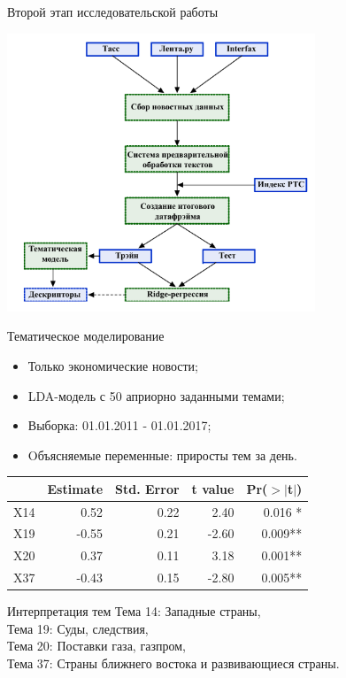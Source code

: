 \documentclass[c, dvipsnames]{beamer}  %
\begin{document}
\begin{frame}{Второй этап исследовательской работы}
 \begin{center}
	\includegraphics[width=0.69\textwidth]{etapp_2.png}
\end{center}
\end{frame}


\begin{frame}{Тематическое моделирование}
\begin{itemize}
	\item  Только экономические новости;
	\item  LDA-модель с 50 априорно заданными темами;
	\item Выборка: 01.01.2011 - 01.01.2017;
	\item  Oбъясняемые переменные: приросты тем за день.
\end{itemize}

\scriptsize
\begin{table}[ht]
	\centering
	\begin{tabular}{rrrrr}
		\hline
		& Estimate & Std. Error & t value & Pr($>$$|$t$|$) \\
		\hline
		X14 & 0.52  & 0.22  & 2.40 & 0.016 * \\
		X19 & -0.55 & 0.21 & -2.60 & 0.009** \\
		X20 & 0.37 & 0.11 & 3.18 & 0.001** \\
		X37 & -0.43 & 0.15 & -2.80 & 0.005** \\
		\hline
	\end{tabular}
\end{table}

\begin{block}{Интерпретация тем}
 	 Тема 14:  Западные страны,  \\ Тема 19:  Суды, следствия, \\ Тема 20: Поставки газа, газпром,  \\ Тема 37:  Страны ближнего востока и развивающиеся страны.
\end{block}
\end{frame}
\end{document}
